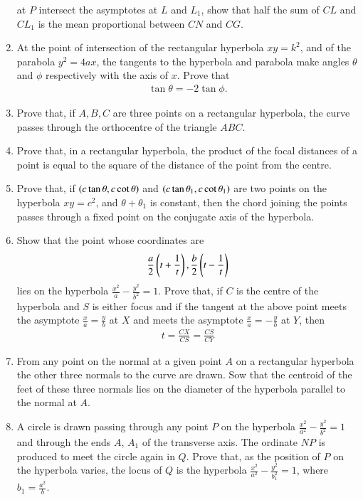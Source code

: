 \begin{enumerate}[label=\arabic*.,ref=\thesubsection.\theenumi]
at $P$ intersect the asymptotes at $L$ and $L_1$, show that half the sum of $CL$ and $CL_1$ is the mean
proportional between $CN$ and $CG$.
\item At the point of intersection of the rectangular hyperbola $xy=k^2$, and of the parabola $y^2=4ax$, the tangents
to the hyperbola and parabola make angles $\theta$ and $\phi$ respectively with the axis of $x$.  Prove that
\begin{align*}
\tan\theta = -2\tan\phi.
\end{align*}
\item Prove that, if $A, B, C$ are three points on a rectangular hyperbola, the curve passes through the orthocentre
of the triangle $ABC$.
\item Prove that, in a rectangular hyperbola, the product of the focal distances of a point is equal
to the square of the distance of the point from the centre.
\item Prove that, if $\left(c\tan\theta,c\cot\theta\right)$ and $\left(c\tan\theta_1,c\cot\theta_1\right)$ are two points on 
the hyperbola $xy=c^2$, and $\theta+\theta_1$ is constant, then the chord
joining the points passes through a fixed point on the conjugate axis of the hyperbola.
\item Show that the point whose coordinates are
\begin{align*}
\frac{a}{2}\left(t+\frac{1}{t}\right), \frac{b}{2}\left(t-\frac{1}{t}\right)
\end{align*}
lies on the hyperbola $\frac{x^2}{a}-\frac{y^2}{b^2} = 1$. Prove that, if $C$ is the centre of the hyperbola and $S$ is either focus 
and if the tangent at the above point meets the asymptote $\frac{x}{a}=\frac{y}{b}$ at $X$ and meets the asymptote $\frac{x}{a}=-\frac{y}{b}$
 at $Y$, then
\begin{align*}
t = \frac{CX}{CS} = \frac{CS}{CY}
\end{align*}
\item From any point on the normal at a given point $A$ on a rectangular hyperbola the other three normals to
the curve are drawn.  Sow that the centroid of the feet of these three normals lies on the diameter of the hyperbola
parallel to the normal at $A$.
\item A circle is drawn passing through any point $P$ on the hyperbola $\frac{x^2}{a^2}-\frac{y^2}{b^2}=1$ and through the ends $A$, $A_1$ of
the transverse axis.  The ordinate $NP$ is produced to  meet the circle again in $Q$.  Prove that, as
the position of $P$ on the hyperbola varies, the locus of $Q$ is the hyperbola $\frac{x^2}{a^2}-\frac{y^2}{b_1^2} = 1$, where $b_1 = \frac{a^2}{b}$.
\end{enumerate}
